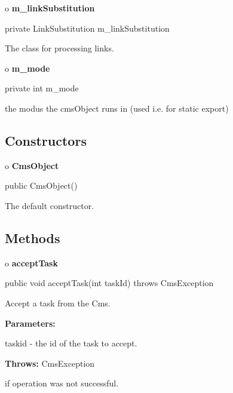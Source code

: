 o {\bf m\_linkSubstitution} 

\begin{PRE}
 private LinkSubstitution m\_linkSubstitution
\end{PRE}

\begin{description}
\htmlDD The class for processing links.

\end{description}

o {\bf m\_mode} 

\begin{PRE}
 private int m\_mode
\end{PRE}

\begin{description}
\htmlDD the modus the cmsObject runs in (used i.e. for static export)

\end{description}

\subsection*{  Constructors }

o {\bf CmsObject} 

\begin{PRE}
 public CmsObject()
\end{PRE}

\begin{description}
\htmlDD The default constructor. 

\end{description}

\subsection*{  Methods }

o {\bf acceptTask} 

\begin{PRE}
 public void acceptTask(int taskId) throws CmsException
\end{PRE}

\begin{description}
\htmlDD Accept a task from the Cms. 

\begin{description}
\item {\bf Parameters:}  

taskid - the id of the task to accept.  
\item {\bf Throws:} CmsException  

if operation was not successful.  
\end{description}

\end{description}

